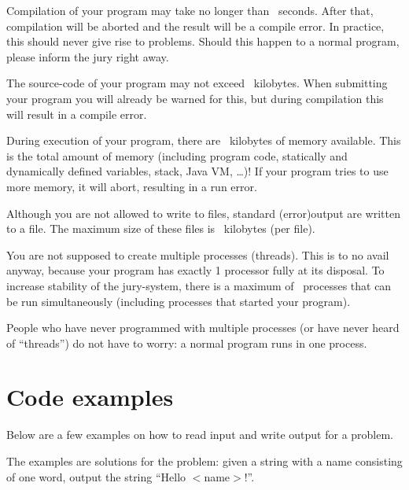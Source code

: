 \begin{description}
\item[compile time]
Compilation of your program may take no longer than \COMPILETIME\
seconds. After that, compilation will be aborted and the result will
be a compile error. In practice, this should never give rise to
problems. Should this happen to a normal program, please inform the
jury right away.

\item[source size]
The source-code of your program may not exceed \SOURCESIZE\ kilobytes.
When submitting your program you will already be warned for this, but
during compilation this will result in a compile error.

\item[memory]
During execution of your program, there are \MEMLIMIT\ kilobytes of
memory available. This is the total amount of memory (including
program code, statically and dynamically defined variables, stack,
Java VM, \dots)! If your program tries to use more memory, it will
abort, resulting in a run error.

\item[filesize]
Although you are not allowed to write to files, standard (error)output
are written to a file. The maximum size of these files is \FILELIMIT\
kilobytes (per file).

\item[number of processes]
You are not supposed to create multiple processes (threads). This is
to no avail anyway, because your program has exactly 1 processor fully
at its disposal. To increase stability of the jury-system, there is a
maximum of \PROCLIMIT\ processes that can be run simultaneously
(including processes that started your program).

People who have never programmed with multiple processes (or have
never heard of ``threads'') do not have to worry: a normal program
runs in one process.

\end{description}


\newpage
\appendix

\section{Code examples}\label{codeexamples}

Below are a few examples on how to read input and write output for a
problem.

The examples are solutions for the problem: given a string with a name
consisting of one word, output the string ``Hello $<$name$>$!''.


